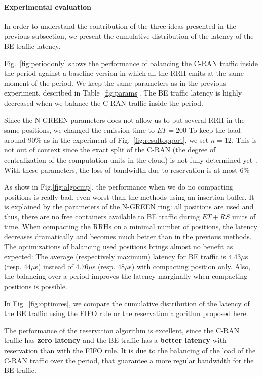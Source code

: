 \documentclass[10pt, conference, letterpaper]{IEEEtran}
\begin{document}
  \paragraph{Experimental evaluation}

  In order to understand the contribution of the three ideas presented in the previous subsection,
   we present the cumulative distribution of the latency of the BE traffic latency.
   
Fig.~\ref{fig:periodonly} shows the performance of balancing the C-RAN traffic inside the period against a baseline version in which all the RRH emits at the same moment of the period. We keep the same parameters as in the previous experiment, described in Table~\ref{fig:params}. The BE traffic latency is highly decreased when we balance the C-RAN traffic inside the period.

 Since the N-GREEN parameters does not allow us to put several RRH in the same positions, we changed the emission time to $ET = 200$ To keep the load around $90\%$ as in the experiment of Fig.~\ref{fig:resultopport}, we set $n = 12$. This is not out of context since the exact split of the C-RAN (the degree of centralization of the computation units in the cloud) is not fully determined yet~\cite{mobile2011c}. With these parameters, the loss of bandwidth due to reservation is at most $6\%$

As show in Fig.\ref{fig:algocmp}, the performance when we do no compacting positions is really bad, even worst than the methods using an insertion buffer. It is explained by the parameters of the N-GREEN ring: all positions are used and thus, there are no free containers available to BE traffic during $ET+RS$ units of time. When compacting the RRHs on a minimal number of positions, the latency decreases dramatically and becomes much better than in the previous methods. The optimizations of balancing used positions brings almost no benefit as expected: The average (respectively maximum) latency for BE traffic is $4.43\mu$s (resp. $44\mu$s) instead of $4.76\mu$s (resp. $48\mu$s) with compacting position only. Also, the balancing over a period improves the latency marginally when compacting positions is possible. 


In Fig.~\ref{fig:optimres}, we compare the cumulative distribution of the latency of the BE traffic using the FIFO rule or the reservation algorithm proposed here.

  The performance of the reservation algorithm is excellent, since the C-RAN traffic has {\bf zero latency} and the BE traffic has a \textbf{better latency} with reservation than with the FIFO rule. It is due to the balancing of the load of the C-RAN traffic over the period, that guarantee a more regular bandwidth for the BE traffic.
  
\end{document}
